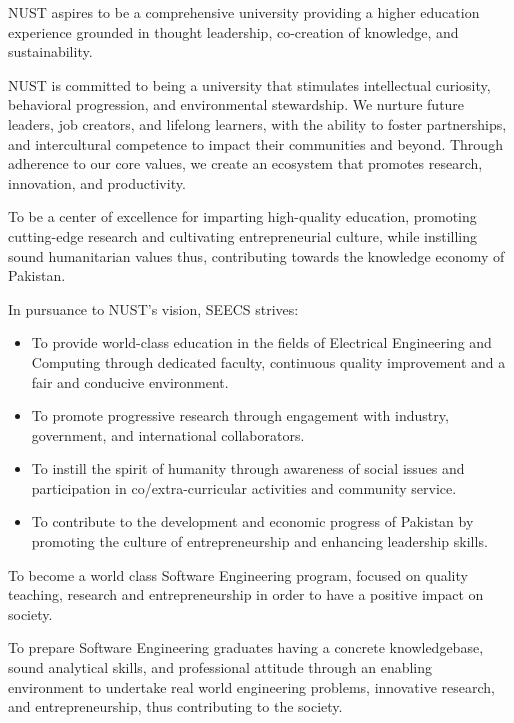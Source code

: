 \begin{description}[leftmargin=1.6em,style=sameline,itemsep=5pt,topsep=4pt]
\item[NUST Vision:] NUST aspires to be a comprehensive university providing a higher education experience grounded in thought leadership, co-creation of knowledge, and sustainability.
\item[NUST Mission:] NUST is committed to being a university that stimulates intellectual curiosity, behavioral progression, and environmental stewardship. We nurture future leaders, job creators, and lifelong learners, with the ability to foster partnerships, and intercultural competence to impact their communities and beyond. Through adherence to our core values, we create an ecosystem that promotes research, innovation, and productivity.
\item[SEECS Vision:] To be a center of excellence for imparting high-quality education, promoting cutting-edge research and cultivating entrepreneurial culture, while instilling sound humanitarian values thus, contributing towards the knowledge economy of Pakistan.
\item[SEECS Mission:] In pursuance to NUST's vision, SEECS strives:
\begin{itemize}[leftmargin=1.3em,nosep,topsep=3pt]
\item To provide world-class education in the fields of Electrical Engineering and Computing through dedicated faculty, continuous quality improvement and a fair and conducive environment.
\item To promote progressive research through engagement with industry, government, and international collaborators.
\item To instill the spirit of humanity through awareness of social issues and participation in co/extra-curricular activities and community service.
\item To contribute to the development and economic progress of Pakistan by promoting the culture of entrepreneurship and enhancing leadership skills.
\end{itemize}
\item[Department Vision:] To become a world class Software Engineering program, focused on quality teaching, research and entrepreneurship in order to have a positive impact on society.
\item[Department Mission:] To prepare Software Engineering graduates having a concrete knowledgebase, sound analytical skills, and professional attitude through an enabling environment to undertake real world engineering problems, innovative research, and entrepreneurship, thus contributing to the society.
\end{description}

